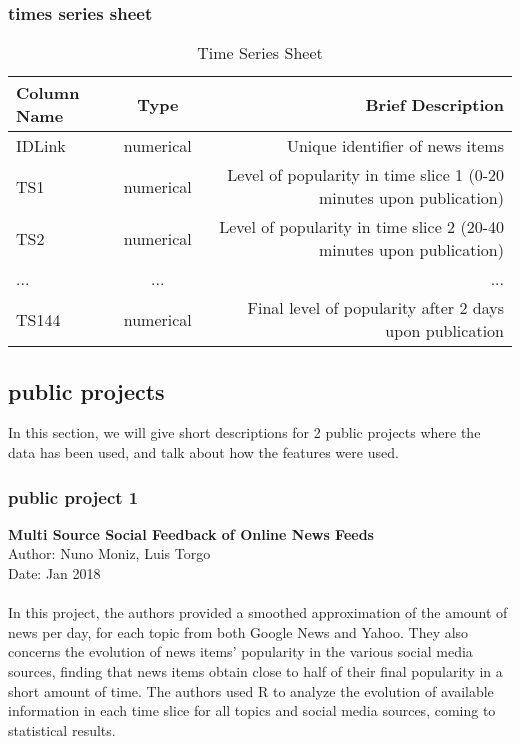 \documentclass[10pt]{article}
\begin{document}
\subsubsection{times series sheet}
\begin{table}[h!]
    \begin{center}
      \caption{Time Series Sheet}
      \label{tab:table2}
      \begin{tabular}{l|c|r} 
        \textbf{Column Name} & \textbf{Type} & \textbf{Brief Description}\\
        \hline
        IDLink & numerical & Unique identifier of news items\\
        TS1 & numerical & Level of popularity in time slice 1 (0-20 minutes upon publication)\\
        TS2 & numerical & Level of popularity in time slice 2 (20-40 minutes upon publication)\\
        ... & ... & ...\\
        TS144 & numerical & Final level of popularity after 2 days upon publication\\
      \end{tabular}
    \end{center}
  \end{table}

\subsection{public projects}
In this section, we will give short descriptions for 2 public projects where 
the data has been used, and talk about how the features were used.
\subsubsection{public project 1}
\textbf{Multi Source Social Feedback of Online News Feeds}\\
Author: Nuno Moniz, Luis Torgo\\
Date: Jan 2018\\
\\
In this project, the authors provided a smoothed approximation of the amount of 
news per day, for each topic from both Google News and Yahoo. They also 
concerns the evolution of news items’ popularity in the various social media sources, 
finding that news items obtain close to half of their final popularity in a 
short amount of time. The authors used R to analyze the evolution of available 
information in each time slice for all topics and social media sources, coming to 
statistical results.\\
\end{document}
